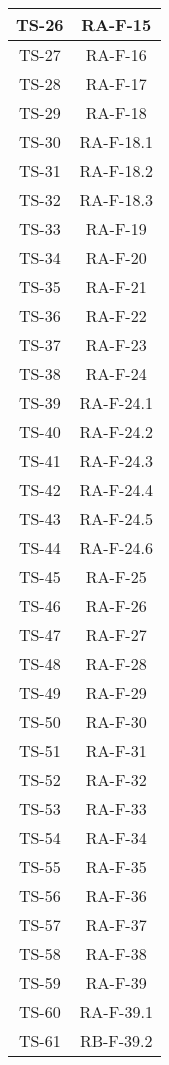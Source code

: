 \begin{center}
\begin{longtable}{|c|c|}
			\hline
			TS-26 & RA-F-15 \\
			\hline
			TS-27 & RA-F-16 \\
			\hline
			TS-28 & RA-F-17 \\
			\hline
			TS-29 & RA-F-18 \\
			\hline
			TS-30 & RA-F-18.1 \\
			\hline
			TS-31 & RA-F-18.2 \\
			\hline
			TS-32 & RA-F-18.3 \\
			\hline
			TS-33 & RA-F-19 \\
			\hline
			TS-34 & RA-F-20 \\
			\hline
			TS-35 & RA-F-21 \\
			\hline
			TS-36 & RA-F-22 \\
			\hline
			TS-37 & RA-F-23 \\
			\hline
			TS-38 & RA-F-24 \\
			\hline
			TS-39 & RA-F-24.1 \\
			\hline
			TS-40 & RA-F-24.2 \\
			\hline
			TS-41 & RA-F-24.3 \\
			\hline
			TS-42 & RA-F-24.4 \\
			\hline
			TS-43 & RA-F-24.5 \\
			\hline
			TS-44 & RA-F-24.6 \\
			\hline
			TS-45 & RA-F-25 \\
			\hline
			TS-46 & RA-F-26 \\
			\hline
			TS-47 & RA-F-27 \\
			\hline
			TS-48 & RA-F-28 \\
			\hline
			TS-49 & RA-F-29 \\
			\hline
			TS-50 & RA-F-30 \\
			\hline
			TS-51 & RA-F-31 \\
			\hline
			TS-52 & RA-F-32 \\
			\hline
			TS-53 & RA-F-33 \\
			\hline
			TS-54 & RA-F-34 \\
			\hline
			TS-55 & RA-F-35 \\
			\hline
			TS-56 & RA-F-36 \\
			\hline
			TS-57 & RA-F-37 \\
			\hline
			TS-58 & RA-F-38 \\
			\hline
			TS-59 & RA-F-39 \\
			\hline
			TS-60 & RA-F-39.1 \\
			\hline
			TS-61 & RB-F-39.2 \\

\end{longtable}
\end{center}

